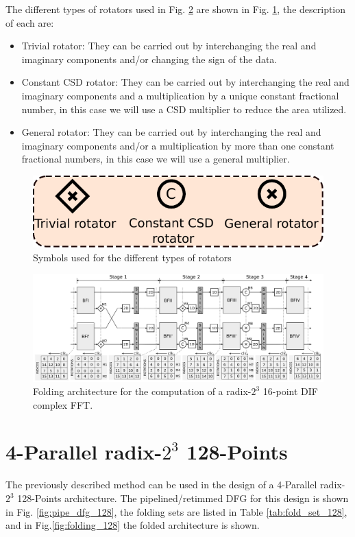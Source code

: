 \documentclass[journal,comsoc]{IEEEtran}
\begin{document}
The different types of rotators used in Fig. \ref{fig:folding_16_arch} are shown in Fig. \ref{fig:rotators}, the description of each are:
\begin{itemize}
	\item Trivial rotator: They can be carried out by interchanging the real and imaginary components and/or changing the sign of the data.
	\item Constant CSD rotator: They can be carried out by interchanging the real and imaginary components and a multiplication by a unique constant fractional number, in this case we will use a CSD multiplier to reduce the area utilized.
	\item General rotator: They can be carried out by interchanging the real and imaginary components and/or a multiplication by more than one constant fractional numbers, in this case we will use a general multiplier.
\end{itemize}

\begin{figure} 
	\centering
	\includegraphics[width=0.6\linewidth]{Diagramas/miSeccionFiguras/Rotadores.pdf}
	\caption{Symbols used for the different types of rotators}
	\label{fig:rotators}
\end{figure}


\begin{figure} 
	\centering
	\includegraphics[width=\linewidth]{Diagramas/folding-16.png}
	\caption{Folding architecture for the computation of a radix-$2^3$ 16-point DIF complex FFT.}
	\label{fig:folding_16_arch}
\end{figure}



\section{4-Parallel radix-$2^3$ 128-Points}   \label{sec:imp128}
The previously described method can be used in the design of a 4-Parallel radix-$2^3$ 128-Points architecture. 
The pipelined/retimmed  DFG for this design is shown in Fig. \ref{fig:pipe_dfg_128}, the folding sets are listed in Table \ref{tab:fold_set_128}, and in Fig.\ref{fig:folding_128}  the folded architecture is shown.
\end{document}
